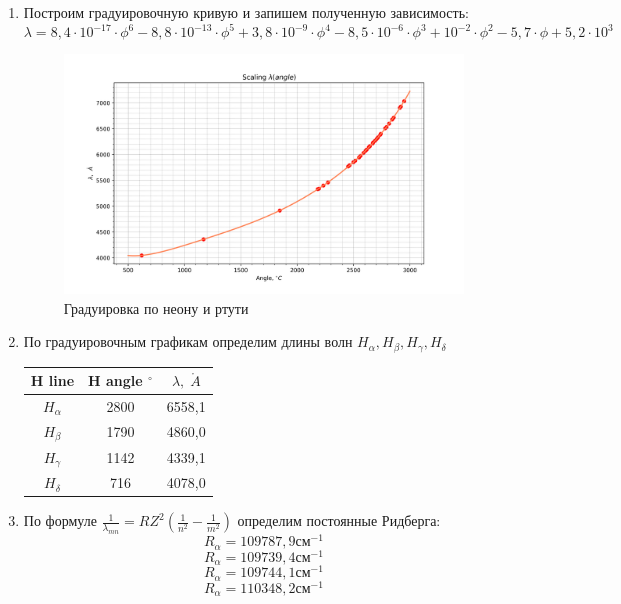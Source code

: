 \documentclass[a4paper]{article}
\begin{document}
\begin{enumerate}
    \item Построим градуировочную кривую и запишем полученную зависимость:
    $$\lambda = 8,4\cdot10^{-17}\cdot\phi^6-8,8\cdot10^{-13}\cdot\phi^5+3,8\cdot10^{-9}\cdot\phi^4-8,5\cdot10^{-6}\cdot\phi^3+10^{-2}\cdot\phi^2-5,7\cdot\phi+5,2\cdot10^3$$

    \begin{figure}[H]
        \begin{center}
        \includegraphics[scale = 0.6]{Scale.png}
        \caption{Градуировка по неону и ртути }
        \label{Neon}
        \end{center}
    \end{figure}


    \item По градуировочным графикам определим длины волн $H_{\alpha}, H_{\beta}, H_{\gamma}, H_{\delta}$

    \begin{table}[htb]
        \centering
        \begin{tabular}{|c|c|c|}
            \hline
            H line & H angle $^{\circ}$ &  $\lambda, \; \mathring{A}$  \\
            \hline 
            $H_{\alpha}$ & 2800 & 6558,1  \\\hline
            $H_{\beta}$ & 1790 & 4860,0  \\\hline
            $H_{\gamma}$& 1142 & 4339,1\\\hline
            $H_{\delta}$ & 716 & 4078,0 \\ \hline

        \end{tabular}
    \end{table}

    
    \item По формуле $\frac{1}{\lambda_{mn}} = RZ^2(\frac{1}{n^2} - \frac{1}{m^2})$ определим постоянные Ридберга:
    $$R_\alpha = 109787,9 см^{-1} $$
    $$R_\alpha = 109739,4 см^{-1} $$
    $$R_\alpha = 109744,1 см^{-1} $$
    $$R_\alpha = 110348,2 см^{-1} $$


\end{enumerate}
\end{document}
